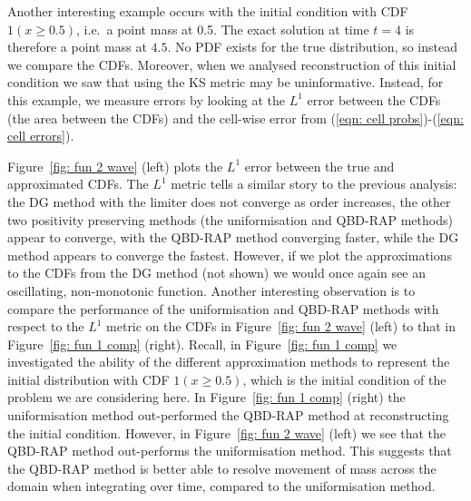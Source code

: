 \begin{example}\label{ex: wave 2}
Another interesting example occurs with the initial condition with CDF \(1(x\geq 0.5)\), i.e.~a point mass at 0.5. The exact solution at time \(t=4\) is therefore a point mass at \(4.5\). No PDF exists for the true distribution, so instead we compare the CDFs. Moreover, when we analysed reconstruction of this initial condition we saw that using the KS metric may be uninformative. Instead, for this example, we measure errors by looking at the \(L^1\) error between the CDFs (the area between the CDFs) and the cell-wise error from (\ref{eqn: cell probs})-(\ref{eqn: cell errors}).

Figure~\ref{fig: fun 2 wave} (left) plots the \(L^1\) error between the true and approximated CDFs. The \(L^1\) metric tells a similar story to the previous analysis: the DG method with the limiter does not converge as order increases, the other two positivity preserving methods (the uniformisation and QBD-RAP methods) appear to converge, with the QBD-RAP method converging faster, while the DG method appears to converge the fastest. However, if we plot the approximations to the CDFs from the DG method (not shown) we would once again see an oscillating, non-monotonic function. Another interesting observation is to compare the performance of the uniformisation and QBD-RAP methods with respect to the \(L^1\) metric on the CDFs in Figure~\ref{fig: fun 2 wave} (left) to that in Figure~\ref{fig: fun 1 comp} (right). Recall, in Figure~\ref{fig: fun 1 comp} we investigated the ability of the different approximation methods to represent the initial distribution with CDF \(1(x\geq 0.5)\), which is the initial condition of the problem we are considering here. In Figure~\ref{fig: fun 1 comp} (right) the uniformisation method out-performed the QBD-RAP method at reconstructing the initial condition. However, in Figure~\ref{fig: fun 2 wave} (left) we see that the QBD-RAP method out-performs the uniformisation method. This suggests that the QBD-RAP method is better able to resolve movement of mass across the domain when integrating over time, compared to the uniformisation method.  


\end{example}
